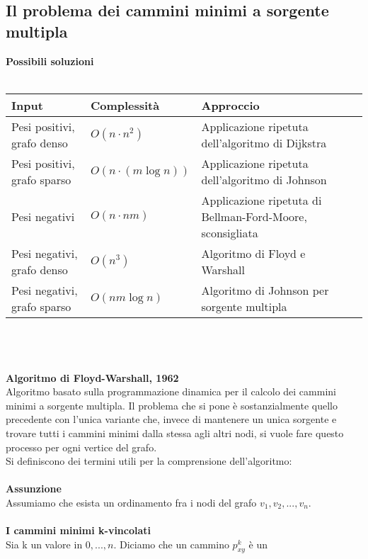 \documentclass[../cheatSheetAlgoritmi.tex]{subfiles}
\begin{document}
\subsection{Il problema dei cammini minimi a sorgente multipla}
\textbf{Possibili soluzioni} \\\\
\begin{tabular}{@{}lllll@{}}
\toprule
Input & Complessità & Approccio &  &  \\ \midrule

Pesi positivi, grafo denso       &  $O(n \cdot n^2)$ & Applicazione ripetuta dell’algoritmo di Dijkstra &  \\

Pesi positivi, grafo sparso        &  $O(n \cdot (m \log n))$ &  Applicazione ripetuta dell’algoritmo di Johnson &  \\

Pesi negativi &  $O(n \cdot nm)$ & Applicazione ripetuta di Bellman-Ford-Moore, sconsigliata & \\

Pesi negativi, grafo denso &  $O(n^3)$ & Algoritmo di Floyd e Warshall &  \\

Pesi negativi, grafo sparso               & $O(nm \log n)$ & Algoritmo di Johnson per sorgente multipla  &  \\ \bottomrule
\end{tabular}\\\\\\
\textbf{Algoritmo di Floyd-Warshall, 1962} \\
Algoritmo basato sulla programmazione dinamica per il calcolo dei cammini minimi a sorgente multipla. Il problema che si pone è sostanzialmente quello precedente con l'unica variante che, invece di mantenere un unica sorgente e trovare tutti i cammini minimi dalla stessa agli altri nodi, si vuole fare questo processo per ogni vertice del grafo.  \\
Si definiscono dei termini utili per la comprensione dell'algoritmo: \\\\
\textbf{Assunzione}  \\
Assumiamo che esista un ordinamento fra i nodi del grafo $v_1 , v_2 , ... , v_n$. \\\\
\textbf{I cammini minimi k-vincolati} \\
Sia k un valore in ${0, ...,  n}$. Diciamo che un cammino $p^{k}_{xy}$ è un
\end{document}
